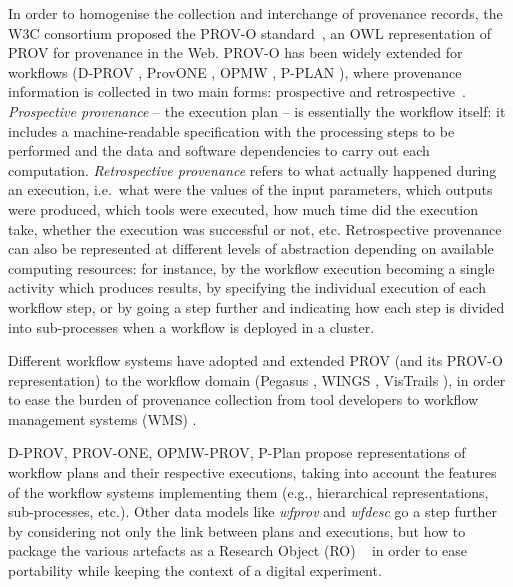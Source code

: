 \documentclass[10pt,letterpaper]{article}
\begin{document}
In order to homogenise the collection and interchange of provenance records, the W3C consortium proposed the PROV-O standard~\cite{Lebo 2013}, an OWL \cite{W3C OWL Working Group 2012} representation of PROV for provenance in the Web.
PROV-O has been widely extended for workflows (D-PROV \cite{Missier 2013}, ProvONE \cite{Cuevas-Vicenttín 2016}, OPMW \cite{Garijo 2011}, P-PLAN \cite{Garijo 2012}), where provenance information is collected in two main forms: prospective and retrospective~\cite{Freire 2008}. \emph{Prospective provenance} – the execution plan – is essentially the workflow itself: it includes a machine-readable specification with the processing steps to be performed and the data and software dependencies to carry out each computation.
\emph{Retrospective provenance} refers to what actually happened during an execution, i.e.~what were the values of the input parameters, which outputs were produced, which tools were executed, how much time did the execution take, whether the execution was successful or not, etc.
Retrospective provenance can also be represented at different levels of abstraction depending on available computing resources: for instance, by the workflow execution becoming a single activity which produces results, by specifying the individual execution of each workflow step, or by going a step further and indicating how each step is divided into sub-processes when a workflow is deployed in a cluster.

Different workflow systems have adopted and extended PROV (and its PROV-O representation) to the workflow domain (Pegasus \cite{Deelman 2005}, WINGS \cite{Garijo 2014}, VisTrails \cite{Scheidegger 2008,Costa 2013}), in order to ease the burden of provenance collection from tool developers to workflow management systems (WMS) \cite{Atkinson 2017,Pérez 2018}.

D-PROV, PROV-ONE, OPMW-PROV, P-Plan propose representations of workflow plans and their respective executions, taking into account the features of the workflow systems implementing them (e.g., hierarchical representations, sub-processes, etc.).
Other data models like \emph{wfprov} and \emph{wfdesc}
\cite{Belhajjame 2015} go a step further by considering not only the link between plans and executions, but how to package the various artefacts as a Research Object (RO) ~\cite{Bechhofer 2013} in order to ease portability while keeping the context of a digital experiment.
\end{document}
